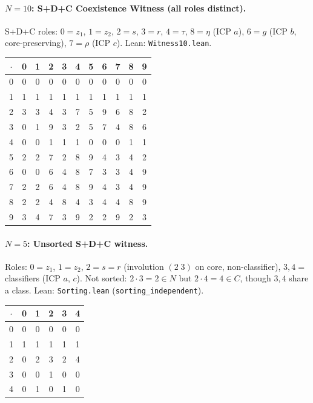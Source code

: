 \documentclass[sigconf,screen]{acmart}
\newcommand{\dotop}{\cdot}
\theoremstyle{remark}
\begin{document}
\paragraph{$N\!=\!10$: S+D+C Coexistence Witness (all roles distinct).}
S+D+C roles: $0 = z_1$, $1 = z_2$, $2 = s$, $3 = r$, $4 = \tau$, $8 = \eta$ (ICP $a$), $6 = g$ (ICP $b$, core-preserving), $7 = \rho$ (ICP $c$). \quad Lean: \texttt{Witness10.lean}.

\medskip
{\footnotesize
\begin{tabular}{c|cccccccccc}
$\dotop$ & 0 & 1 & 2 & 3 & 4 & 5 & 6 & 7 & 8 & 9 \\\hline
0 & 0 & 0 & 0 & 0 & 0 & 0 & 0 & 0 & 0 & 0 \\
1 & 1 & 1 & 1 & 1 & 1 & 1 & 1 & 1 & 1 & 1 \\
2 & 3 & 3 & 4 & 3 & 7 & 5 & 9 & 6 & 8 & 2 \\
3 & 0 & 1 & 9 & 3 & 2 & 5 & 7 & 4 & 8 & 6 \\
4 & 0 & 0 & 1 & 1 & 1 & 0 & 0 & 0 & 1 & 1 \\
5 & 2 & 2 & 7 & 2 & 8 & 9 & 4 & 3 & 4 & 2 \\
6 & 0 & 0 & 6 & 4 & 8 & 7 & 3 & 3 & 4 & 9 \\
7 & 2 & 2 & 6 & 4 & 8 & 9 & 4 & 3 & 4 & 9 \\
8 & 2 & 2 & 4 & 8 & 4 & 3 & 4 & 4 & 8 & 9 \\
9 & 3 & 4 & 7 & 3 & 9 & 2 & 2 & 9 & 2 & 3 \\
\end{tabular}}

\paragraph{$N\!=\!5$: Unsorted S+D+C witness.}
Roles: $0 = z_1$, $1 = z_2$, $2 = s = r$ (involution $(2\;3)$ on core, non-classifier), $3, 4 =$ classifiers (ICP $a$, $c$). Not sorted: $2 \dotop 3 = 2 \in N$ but $2 \dotop 4 = 4 \in C$, though $3, 4$ share a class. \quad Lean: \texttt{Sorting.lean} (\texttt{sorting\_independent}).

\medskip
{\small
\begin{tabular}{c|ccccc}
$\dotop$ & 0 & 1 & 2 & 3 & 4 \\\hline
0 & 0 & 0 & 0 & 0 & 0 \\
1 & 1 & 1 & 1 & 1 & 1 \\
2 & 0 & 2 & 3 & 2 & 4 \\
3 & 0 & 0 & 1 & 0 & 0 \\
4 & 0 & 1 & 0 & 1 & 0 \\
\end{tabular}}
\end{document}
